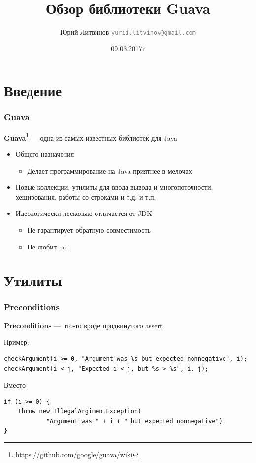 \documentclass[xetex,mathserif,serif]{beamer}
\title{Обзор библиотеки Guava}
\author[Юрий Литвинов]{Юрий Литвинов \newline \textcolor{gray}{\small\texttt{yurii.litvinov@gmail.com}}}
\date{09.03.2017г}
\begin{document}
	
	\frame{\titlepage}
	
	\section{Введение}

	\begin{frame}
		\frametitle{Guava}
		\textbf{Guava}\footnote{https://github.com/google/guava/wiki} --- одна из самых известных библиотек для Java
		\begin{itemize}
			\item Общего назначения
			\begin{itemize}
				\item Делает программирование на Java приятнее в мелочах
			\end{itemize}
			\item Новые коллекции, утилиты для ввода-вывода и многопоточности, хеширования, работы со строками и т.д. и т.п.
			\item Идеологически несколько отличается от JDK
			\begin{itemize}
				\item Не гарантирует обратную совместимость
				\item Не любит null
			\end{itemize}
		\end{itemize}
	\end{frame}

	\section{Утилиты}

	\begin{frame}[fragile]
		\frametitle{Preconditions}
		\textbf{Preconditions} --- что-то вроде продвинутого assert
		
		Пример:
		\begin{verbatim}
checkArgument(i >= 0, "Argument was %s but expected nonnegative", i);
checkArgument(i < j, "Expected i < j, but %s > %s", i, j);
		\end{verbatim}
		Вместо
		\begin{verbatim}
if (i >= 0) { 
    throw new IllegalArgimentException(
            "Argument was " + i + " but expected nonnegative");
}
		\end{verbatim}
\end{frame}
\end{document}
